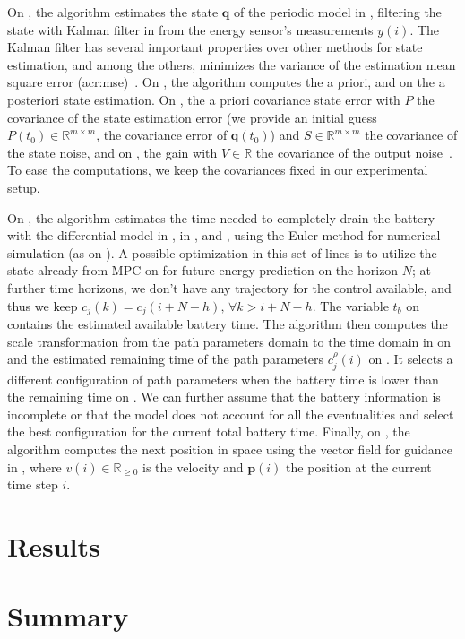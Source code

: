 On , the algorithm estimates the state $\mathbf{q}$ of the periodic model in , filtering the state with Kalman filter in  from the energy sensor's measurements $y(i)$. The Kalman filter has several important properties over other methods for state estimation, and among the others, minimizes the variance of the estimation mean square error (\Gls{acr:mse})~\citep{kalman1960new,simon2006optimal,jwo2007practical}. On , the algorithm computes the a priori, and on  the a posteriori state estimation. On , the a priori covariance state error with $P$ the covariance of the state estimation error (we provide an initial guess $P(t_0)\in\mathbb{R}^{m\times m}$, the covariance error of $\mathbf{q}(t_0)$) and $S\in\mathbb{R}^{m\times m}$ the covariance of the state noise, and on , the gain with $V\in\mathbb{R}$ the covariance of the output noise~\citep{simon2006optimal}. To ease the computations, we keep the covariances fixed in our experimental setup.

On , the algorithm estimates the time needed to completely drain the battery with the differential model in , in , and , using the Euler method for numerical simulation (as on ). A possible optimization in this set of lines is to utilize the state already from MPC on  for future energy prediction on the horizon $N$; at further time horizons, we don't have any trajectory for the control available, and thus we keep $c_j(k)=c_j(i+N-h),\,\forall k>i+N-h$. The variable $t_b$ on  contains the estimated available battery time. The algorithm then computes the scale transformation from the path parameters domain to the time domain in  on  and the estimated remaining time of the path parameters $c_j^\rho(i)$ on . It selects a different configuration of path parameters when the battery time is lower than the remaining time on . We can further assume that the battery information is incomplete or that the model does not account for all the eventualities and select the best configuration for the current total battery time. Finally, on , the algorithm computes the next position in space using the vector field for guidance in , where $v(i)\in\mathbb{R}_{\geq 0}$ is the velocity and $\mathbf{p}(i)$ the position at the current time step $i$. 



\section{\color{red}Results}


\section{\color{red}Summary}


